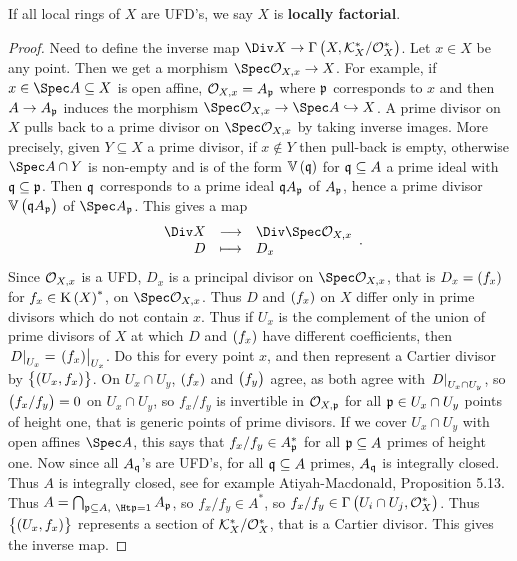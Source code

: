 \begin{definition*}
If all local rings of $ X $ are UFD's, we say $ X $ is \textbf{locally factorial}.
\end{definition*}


\begin{proof}
Need to define the inverse map $ \Div X \to \Gamma\br{X, \KKK_X^* / \OOO_X^*} $. Let $ x \in X $ be any point. Then we get a morphism $ \Spec \OOO_{X, x} \to X $. For example, if $ x \in \Spec A \subseteq X $ is open affine, $ \mathcal{O}_{X, x} = A_{\mathfrak{p}} $ where $ \mathfrak{p} $ corresponds to $ x $ and then $ A \to A_{\mathfrak{p}} $ induces the morphism $ \Spec \OOO_{X, x} \to \Spec A \hookrightarrow X $. A prime divisor on $ X $ pulls back to a prime divisor on $ \Spec \OOO_{X, x} $ by taking inverse images. More precisely, given $ Y \subseteq X $ a prime divisor, if $ x \notin Y $ then pull-back is empty, otherwise $ \Spec A \cap Y $ is non-empty and is of the form $ \VV\br{\qqq} $ for $ \mathfrak{q} \subseteq A $ a prime ideal with $ \mathfrak{q} \subseteq \mathfrak{p} $. Then $ \mathfrak{q} $ corresponds to a prime ideal $ \mathfrak{q} A_{\mathfrak{p}} $ of $ A_{\mathfrak{p}} $, hence a prime divisor $ \VV\br{\qqq A_\ppp} $ of $ \Spec A_\ppp $. This gives a map
$$ \function{\Div X}{\Div \Spec \OOO_{X, x}}{D}{D_x}. $$
Since $ \mathcal{O}_{X, x} $ is a UFD, $ D_x $ is a principal divisor on $ \Spec \OOO_{X, x} $, that is $ D_x = \br{f_x} $ for $ f_x \in \K\br{X}^* $, on $ \Spec \OOO_{X, x} $. Thus $ D $ and $ \br{f_x} $ on $ X $ differ only in prime divisors which do not contain $ x $. Thus if $ U_x $ is the complement of the union of prime divisors of $ X $ at which $ D $ and $ \br{f_x} $ have different coefficients, then $ \eval{D}_{U_x} = \eval{\br{f_x}}_{U_x} $. Do this for every point $ x $, and then represent a Cartier divisor by $ \cbr{\br{U_x, f_x}} $. On $ U_x \cap U_y $, $ \br{f_x} $ and $ \br{f_y} $ agree, as both agree with $ \left. D \right|_{U_x \cap U_y} $, so $ \br{f_x / f_y} = 0 $ on $ U_x \cap U_y $, so $ f_x / f_y $ is invertible in $ \mathcal{O}_{X, \mathfrak{p}} $ for all $ \mathfrak{p} \in U_x \cap U_y $ points of height one, that is generic points of prime divisors. If we cover $ U_x \cap U_y $ with open affines $ \Spec A $, this says that $ f_x / f_y \in A_{\mathfrak{p}}^* $ for all $ \mathfrak{p} \subseteq A $ primes of height one. Now since all $ A_{\mathfrak{q}} $'s are UFD's, for all $ \mathfrak{q} \subseteq A $ primes, $ A_{\mathfrak{q}} $ is integrally closed. Thus $ A $ is integrally closed, see for example Atiyah-Macdonald, Proposition 5.13. Thus $ A = \bigcap_{\ppp \subseteq A, \ \Ht \ppp = 1} A_\ppp $, so $ f_x / f_y \in A^* $, so $ f_x / f_y \in \Gamma\br{U_i \cap U_j, \OOO_X^*} $. Thus $ \cbr{\br{U_x, f_x}} $ represents a section of $ \mathcal{K}_X^* / \mathcal{O}_X^* $, that is a Cartier divisor. This gives the inverse map.
\end{proof}

